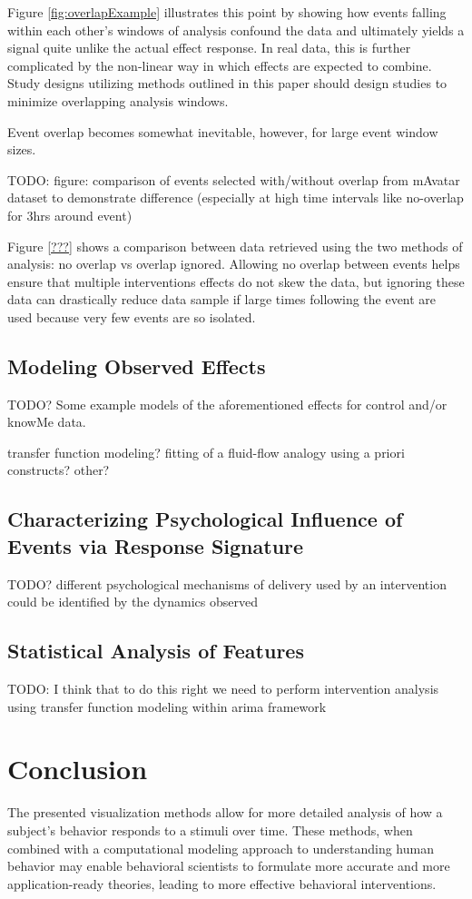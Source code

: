 \documentclass[review,journal]{vgtc}         %
\begin{document}
Figure \ref{fig:overlapExample} illustrates this point by showing how events falling within each other's windows of analysis confound the data and ultimately yields a signal quite unlike the actual effect response.
In real data, this is further complicated by the non-linear way in which effects are expected to combine.
Study designs utilizing methods outlined in this paper should design studies to minimize overlapping analysis windows.

Event overlap becomes somewhat inevitable, however, for large event window sizes.

TODO: figure: comparison of events selected with/without overlap from mAvatar dataset to demonstrate difference (especially at high time intervals like no-overlap for 3hrs around event)

Figure \ref{???} shows a comparison between data retrieved using the two methods of analysis: no overlap vs overlap ignored.
Allowing no overlap between events helps ensure that multiple interventions effects do not skew the data, but ignoring these data can drastically reduce data sample if large times following the event are used because very few events are so isolated.

\subsection{Modeling Observed Effects}
TODO? Some example models of the aforementioned effects for control and/or knowMe data.

transfer function modeling?
fitting of a fluid-flow analogy using a priori constructs?
other?

\subsection{Characterizing Psychological Influence of Events via Response Signature}
TODO? different psychological mechanisms of delivery used by an intervention could be identified by the dynamics observed

\subsection{Statistical Analysis of Features}
TODO: I think that to do this right we need to perform intervention analysis using transfer function modeling within arima framework

\section{Conclusion}
The presented visualization methods allow for more detailed analysis of how a subject’s behavior responds to a stimuli over time.
These methods, when combined with a computational modeling approach to understanding human behavior may enable behavioral scientists to formulate more accurate and more application-ready theories, leading to more effective behavioral interventions.
\end{document}
